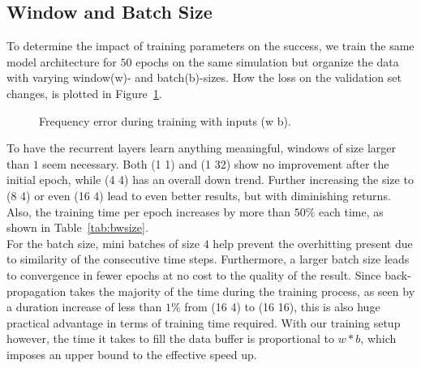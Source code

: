 \documentclass[sigconf]{acmart}
\begin{document}
\subsection{Window and Batch Size}
To determine the impact of training parameters on the success, we train the same model architecture for $50$ epochs on the same simulation but organize the data with varying window(w)- and batch(b)-sizes. How the loss on the validation set changes, is plotted in Figure~\ref{bwsize}.
\begin{figure}
	\caption{Frequency error during training with inputs (w b).}
	\label{bwsize}
\end{figure}
To have the recurrent layers learn anything meaningful, windows of size larger than $1$ seem necessary. Both (1 1) and (1 32) show no improvement after the initial epoch, while (4 4) has an overall down trend. Further increasing the size to (8 4) or even (16 4) lead to even better results, but with diminishing returns. Also, the training time per epoch increases by more than $50\%$ each time, as shown in Table~\ref{tab:bwsize}.\\
For the batch size, mini batches of size $4$ help prevent the overhitting present due to similarity of the consecutive time steps. Furthermore, a larger batch size leads to convergence in fewer epochs at no cost to the quality of the result. Since back-propagation takes the majority of the time during the training process, as seen by a duration increase of less than $1\%$ from (16 4) to (16 16), this is also huge practical advantage in terms of training time required. With our training setup however, the time it takes to fill the data buffer is proportional to $w*b$, which imposes an upper bound to the effective speed up.
\end{document}
